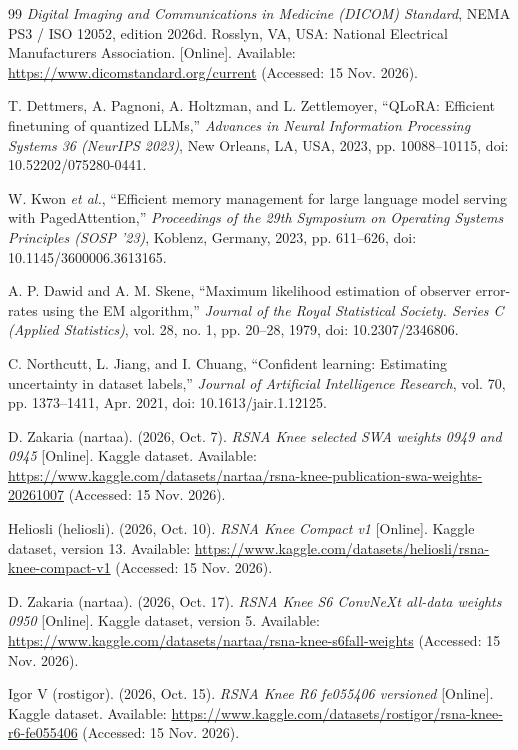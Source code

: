 \begin{thebibliography}{99}
 \textit{Digital Imaging and Communications in Medicine (DICOM) Standard}, NEMA PS3 / ISO 12052, edition 2026d. Rosslyn, VA, USA: National Electrical Manufacturers Association. [Online]. Available: \url{https://www.dicomstandard.org/current} (Accessed: 15 Nov. 2026).

 T. Dettmers, A. Pagnoni, A. Holtzman, and L. Zettlemoyer, ``QLoRA: Efficient finetuning of quantized LLMs,'' \textit{Advances in Neural Information Processing Systems 36 (NeurIPS 2023)}, New Orleans, LA, USA, 2023, pp. 10088--10115, doi: 10.52202/075280-0441.

 W. Kwon \textit{et al.}, ``Efficient memory management for large language model serving with PagedAttention,'' \textit{Proceedings of the 29th Symposium on Operating Systems Principles (SOSP '23)}, Koblenz, Germany, 2023, pp. 611--626, doi: 10.1145/3600006.3613165.

 A. P. Dawid and A. M. Skene, ``Maximum likelihood estimation of observer error-rates using the EM algorithm,'' \textit{Journal of the Royal Statistical Society. Series C (Applied Statistics)}, vol. 28, no. 1, pp. 20--28, 1979, doi: 10.2307/2346806.

 C. Northcutt, L. Jiang, and I. Chuang, ``Confident learning: Estimating uncertainty in dataset labels,'' \textit{Journal of Artificial Intelligence Research}, vol. 70, pp. 1373--1411, Apr. 2021, doi: 10.1613/jair.1.12125.

 D. Zakaria (nartaa). (2026, Oct. 7). \textit{RSNA Knee selected SWA weights 0949 and 0945} [Online]. Kaggle dataset. Available: \url{https://www.kaggle.com/datasets/nartaa/rsna-knee-publication-swa-weights-20261007} (Accessed: 15 Nov. 2026).

 Heliosli (heliosli). (2026, Oct. 10). \textit{RSNA Knee Compact v1} [Online]. Kaggle dataset, version 13. Available: \url{https://www.kaggle.com/datasets/heliosli/rsna-knee-compact-v1} (Accessed: 15 Nov. 2026).

 D. Zakaria (nartaa). (2026, Oct. 17). \textit{RSNA Knee S6 ConvNeXt all-data weights 0950} [Online]. Kaggle dataset, version 5. Available: \url{https://www.kaggle.com/datasets/nartaa/rsna-knee-s6fall-weights} (Accessed: 15 Nov. 2026).

 Igor V (rostigor). (2026, Oct. 15). \textit{RSNA Knee R6 fe055406 versioned} [Online]. Kaggle dataset. Available: \url{https://www.kaggle.com/datasets/rostigor/rsna-knee-r6-fe055406} (Accessed: 15 Nov. 2026).


\end{thebibliography}
